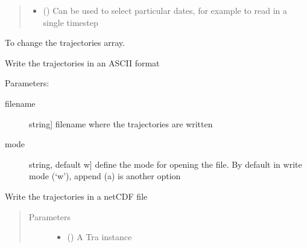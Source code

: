 \documentclass[a4paper,10pt,english]{sphinxmanual}
\begin{document}
\begin{fulllineitems}
\begin{fulllineitems}
\begin{quote}
\begin{description}
\begin{itemize}
\item {} 
 () \textendash{} Can be used to select particular dates, for example
to read in a single timestep

\end{itemize}

\end{description}\end{quote}

\end{fulllineitems}


\begin{fulllineitems}
\label{\detokenize{lagranto:lagranto.Tra.set_array}}
To change the trajectories array.

\end{fulllineitems}


\begin{fulllineitems}
\label{\detokenize{lagranto:lagranto.Tra.write_ascii}}
Write the trajectories in an ASCII format

Parameters:
\begin{description}
\item[{filename}] \leavevmode{[}string{]}
filename where the trajectories are written

\item[{mode}] \leavevmode{[}string, default w{]}
define the mode for opening the file.
By default in write mode (‘w’),
append (a) is another option

\end{description}

\end{fulllineitems}


\begin{fulllineitems}
\label{\detokenize{lagranto:lagranto.Tra.write_netcdf}}
Write the trajectories in a netCDF file
\begin{quote}\begin{description}
\item[{Parameters}] \leavevmode\begin{itemize}
\item {} 
 ({\hyperref[\detokenize{lagranto:lagranto.Tra}]{}}) \textendash{} A Tra instance


\end{itemize}
\end{description}
\end{quote}
\end{fulllineitems}
\end{fulllineitems}
\end{document}
